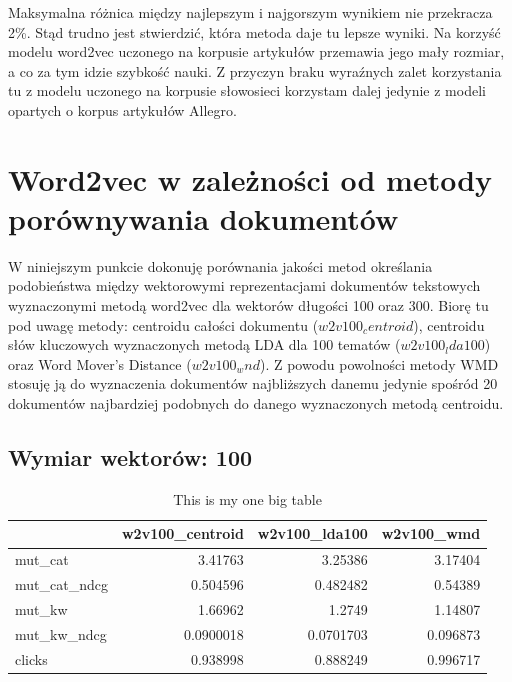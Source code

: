 \documentclass[pl]{minipw} %
\begin{document}
Maksymalna różnica między najlepszym i najgorszym wynikiem nie przekracza 2\%. Stąd trudno jest stwierdzić, która metoda daje tu lepsze wyniki. Na korzyść modelu word2vec uczonego na korpusie artykułów przemawia jego mały rozmiar, a co za tym idzie szybkość nauki. Z przyczyn braku wyraźnych zalet korzystania tu z modelu uczonego na korpusie słowosieci korzystam dalej jedynie z modeli opartych o korpus artykułów Allegro.

\section{Word2vec w zależności od metody porównywania dokumentów}

W niniejszym punkcie dokonuję porównania jakości metod określania podobieństwa między wektorowymi reprezentacjami dokumentów tekstowych wyznaczonymi metodą word2vec dla wektorów długości 100 oraz 300. Biorę tu pod uwagę metody: centroidu całości dokumentu ($w2v100_centroid$), centroidu słów kluczowych wyznaczonych metodą LDA dla 100 tematów ($w2v100_lda100$) oraz Word Mover's Distance ($w2v100_wnd$). Z powodu powolności metody WMD stosuję ją do wyznaczenia dokumentów najbliższych danemu jedynie spośród 20 dokumentów najbardziej podobnych do danego wyznaczonych metodą centroidu.

\subsection{Wymiar wektorów: 100}

\begin{table}
	\centering
	\begin{tabular}{lrrr}
		\hline
		&   w2v100\_centroid &   w2v100\_lda100 &   w2v100\_wmd \\
		\hline
		mut\_cat      &         3.41763   &       3.25386   &     3.17404  \\
		mut\_cat\_ndcg &         0.504596  &       0.482482  &     0.54389  \\
		mut\_kw       &         1.66962   &       1.2749    &     1.14807  \\
		mut\_kw\_ndcg  &         0.0900018 &       0.0701703 &     0.096873 \\
		clicks       &         0.938998  &       0.888249  &     0.996717 \\
		\hline
	\end{tabular}
	\caption{This is my one big table}
\end{table}
\end{document}
